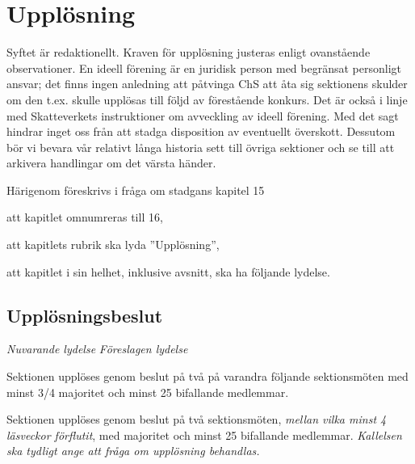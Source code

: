 \documentclass{article}
\newenvironment{lydelse}
    {\begin{paracol}{2}%
        \emph{Nuvarande lydelse}%
        \switchcolumn%
        \emph{Föreslagen lydelse}%
    \end{paracol}%
    \begin{enumerate}[label=\thesubsection.\arabic*]%
    \begin{paracol}{2}%
    }{\end{paracol}\end{enumerate}}
\begin{document}
\section{Upplösning}
Syftet är redaktionellt.
Kraven för upplösning justeras enligt ovanstående observationer.
En ideell förening är en juridisk person med begränsat personligt ansvar; det finns ingen anledning att påtvinga ChS att åta sig sektionens skulder om den t.ex. skulle upplösas till följd av förestående konkurs.
Det är också i linje med Skatteverkets instruktioner om avveckling av ideell förening.
Med det sagt hindrar inget oss från att stadga disposition av eventuellt överskott.
Dessutom bör vi bevara vår relativt långa historia sett till övriga sektioner och se till att arkivera handlingar om det värsta händer.

Härigenom föreskrivs i fråga om stadgans kapitel 15
\begin{dels}
  \item att kapitlet omnumreras till 16,
  \item att kapitlets rubrik ska lyda ''Upplösning'',
  \item att kapitlet i sin helhet, inklusive avsnitt, ska ha följande lydelse.
\end{dels}

\subsection{Upplösningsbeslut}
\begin{lydelse}
  \setcounter{section}{15}
  \setcounter{subsection}{0}
  \item Sektionen upplöses genom beslut på två på varandra följande sektionsmöten med minst 3/4 majoritet och minst 25 bifallande medlemmar.
  \switchcolumn
  \setcounter{subsection}{1}
  \item Sektionen upplöses genom beslut på två sektionsmöten, \emph{mellan vilka minst 4 läsveckor förflutit}, med  majoritet och minst 25 bifallande medlemmar. \label{maj:up}
  \emph{Kallelsen ska tydligt ange att fråga om upplösning behandlas.} \label{16.0:upplösning}
\end{lydelse}
\setcounter{section}{16}
\setcounter{subsection}{1}
\end{document}
